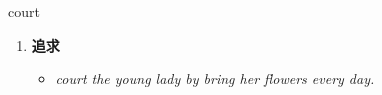 
\begin{frame}
{\huge court}
\begin{center}
\begin{enumerate}\Large
  \item \textbf{追求}
  \begin{itemize}
    \item \em{\Large{court the young lady by bring her flowers every day.}}
  \end{itemize}
\end{enumerate}
\end{center}
\end{frame}
